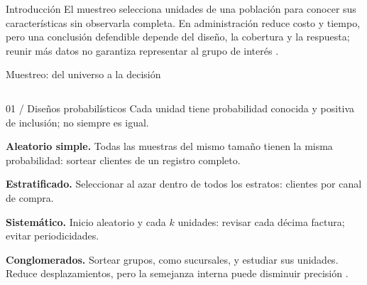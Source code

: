 \documentclass[spanish,final,xcolor={dvipsnames,table}]{beamer}
\newlength{\itescapanelwidth}
\begin{document}
\templatePagecfg\templateFinalcfg
\setlength{\parindent}{0pt}
\begin{itescaposter}
\fontsize{12}{14.2}\selectfont\setlength{\parindent}{0pt}
\begin{block}{Introducción}
El muestreo selecciona unidades de una población para conocer sus características sin observarla completa. En administración reduce costo y tiempo, pero una conclusión defendible depende del diseño, la cobertura y la respuesta; reunir más datos no garantiza representar al grupo de interés \citep{bradley2021,holmesBusiness2023}.
\end{block}

\begin{block}{Muestreo: del universo a la decisión}
\centering
{}
\end{block}

\begin{columns}[t,totalwidth=\colwidth]
\begin{column}{\itescapanelwidth}
\begin{itescaposterpanel}{01 / Diseños probabilísticos}
Cada unidad tiene probabilidad conocida y positiva de inclusión; no siempre es igual.

\textbf{Aleatorio simple.} Todas las muestras del mismo tamaño tienen la misma probabilidad: sortear clientes de un registro completo.

\textbf{Estratificado.} Seleccionar al azar dentro de todos los estratos: clientes por canal de compra.

\textbf{Sistemático.} Inicio aleatorio y cada $k$ unidades: revisar cada décima factura; evitar periodicidades.

\textbf{Conglomerados.} Sortear grupos, como sucursales, y estudiar sus unidades. Reduce desplazamientos, pero la semejanza interna puede disminuir precisión \citep{holmesBusiness2023}.
\end{itescaposterpanel}


\end{column}
\end{columns}
\end{itescaposter}
\end{document}
